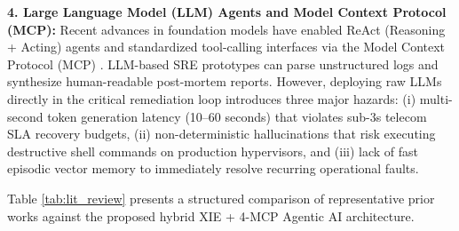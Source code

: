 \textbf{4. Large Language Model (LLM) Agents and Model Context Protocol (MCP):} Recent advances in foundation models have enabled ReAct (Reasoning + Acting) agents \cite{yao2023react} and standardized tool-calling interfaces via the Model Context Protocol (MCP) \cite{anthropic2024mcp}. LLM-based SRE prototypes can parse unstructured logs and synthesize human-readable post-mortem reports. However, deploying raw LLMs directly in the critical remediation loop introduces three major hazards: (i) multi-second token generation latency (10--60 seconds) that violates sub-3s telecom SLA recovery budgets, (ii) non-deterministic hallucinations that risk executing destructive shell commands on production hypervisors, and (iii) lack of fast episodic vector memory \cite{malkov2018hnsw} to immediately resolve recurring operational faults.

Table \ref{tab:lit_review} presents a structured comparison of representative prior works against the proposed hybrid XIE + 4-MCP Agentic AI architecture.

